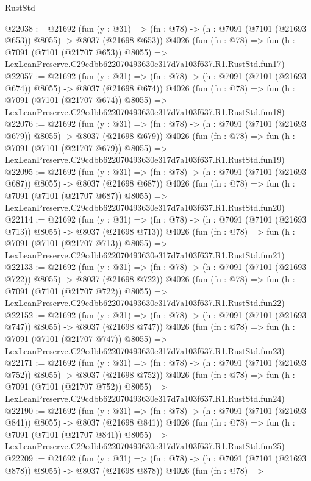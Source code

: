 \begin{lexlean}{RustStd}
\begin{coremodule}
@22038 := @21692
    (fun (y : @31) => (fn : @78) -> (h : @7091 (@7101 (@21693 @653)) @8055) -> @8037 (@21698 @653))
    @4026
    (fun (fn : @78) =>
    fun (h : @7091 (@7101 (@21707 @653)) @8055) =>
    LexLeanPreserve.C29cdbb622070493630e317d7a103f637.R1.RustStd.fun17)
@22057 := @21692
    (fun (y : @31) => (fn : @78) -> (h : @7091 (@7101 (@21693 @674)) @8055) -> @8037 (@21698 @674))
    @4026
    (fun (fn : @78) =>
    fun (h : @7091 (@7101 (@21707 @674)) @8055) =>
    LexLeanPreserve.C29cdbb622070493630e317d7a103f637.R1.RustStd.fun18)
@22076 := @21692
    (fun (y : @31) => (fn : @78) -> (h : @7091 (@7101 (@21693 @679)) @8055) -> @8037 (@21698 @679))
    @4026
    (fun (fn : @78) =>
    fun (h : @7091 (@7101 (@21707 @679)) @8055) =>
    LexLeanPreserve.C29cdbb622070493630e317d7a103f637.R1.RustStd.fun19)
@22095 := @21692
    (fun (y : @31) => (fn : @78) -> (h : @7091 (@7101 (@21693 @687)) @8055) -> @8037 (@21698 @687))
    @4026
    (fun (fn : @78) =>
    fun (h : @7091 (@7101 (@21707 @687)) @8055) =>
    LexLeanPreserve.C29cdbb622070493630e317d7a103f637.R1.RustStd.fun20)
@22114 := @21692
    (fun (y : @31) => (fn : @78) -> (h : @7091 (@7101 (@21693 @713)) @8055) -> @8037 (@21698 @713))
    @4026
    (fun (fn : @78) =>
    fun (h : @7091 (@7101 (@21707 @713)) @8055) =>
    LexLeanPreserve.C29cdbb622070493630e317d7a103f637.R1.RustStd.fun21)
@22133 := @21692
    (fun (y : @31) => (fn : @78) -> (h : @7091 (@7101 (@21693 @722)) @8055) -> @8037 (@21698 @722))
    @4026
    (fun (fn : @78) =>
    fun (h : @7091 (@7101 (@21707 @722)) @8055) =>
    LexLeanPreserve.C29cdbb622070493630e317d7a103f637.R1.RustStd.fun22)
@22152 := @21692
    (fun (y : @31) => (fn : @78) -> (h : @7091 (@7101 (@21693 @747)) @8055) -> @8037 (@21698 @747))
    @4026
    (fun (fn : @78) =>
    fun (h : @7091 (@7101 (@21707 @747)) @8055) =>
    LexLeanPreserve.C29cdbb622070493630e317d7a103f637.R1.RustStd.fun23)
@22171 := @21692
    (fun (y : @31) => (fn : @78) -> (h : @7091 (@7101 (@21693 @752)) @8055) -> @8037 (@21698 @752))
    @4026
    (fun (fn : @78) =>
    fun (h : @7091 (@7101 (@21707 @752)) @8055) =>
    LexLeanPreserve.C29cdbb622070493630e317d7a103f637.R1.RustStd.fun24)
@22190 := @21692
    (fun (y : @31) => (fn : @78) -> (h : @7091 (@7101 (@21693 @841)) @8055) -> @8037 (@21698 @841))
    @4026
    (fun (fn : @78) =>
    fun (h : @7091 (@7101 (@21707 @841)) @8055) =>
    LexLeanPreserve.C29cdbb622070493630e317d7a103f637.R1.RustStd.fun25)
@22209 := @21692
    (fun (y : @31) => (fn : @78) -> (h : @7091 (@7101 (@21693 @878)) @8055) -> @8037 (@21698 @878))
    @4026
    (fun (fn : @78) =>

\end{coremodule}
\end{lexlean}
